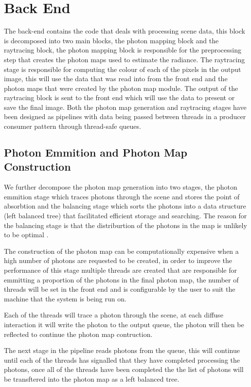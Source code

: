 \section{Back End}
The back-end contains the code that deals with processing scene data, this block is decomposed into
two main blocks, the photon mapping block and the raytracing block, the photon mapping block is responsible
for the preprocessing step that creates the photon maps used to estimate the radiance. The raytracing stage
is responsible for computing the colour of each of the pixels in the output image, this will use the data
that was read into from the front end and the photon maps that were created by the photon map module. The
output of the raytracing block is sent to the front end which will use the data to present or save the final
image. Both the photon map generation and raytracing stages have been designed as pipelines with data being passed
between threads in a producer consumer pattern through thread-safe queues.

\subsection{Photon Emmition and Photon Map Construction}
We further decompose the photon map generation into two stages, the photon emmition stage which traces photons
through the scene and stores the point of absorbtion and the balancing stage which sorts the photons into
a data structure (left balanced tree) that facilitated efficient storage and searching.
The reason for the balancing stage is that the distriburtion of the photons in the map is unlikely to be
optimal \cite{JensenBook}.

The construction of the photon map can be computationally expensive when a high number of photons are
requested to be created, in order to improve the performance of this stage multiple threads are created
that are responsible for emmitting a proportion of the photons in the final photon map, the number of threads will be
set in the front end and is configurable by the user to suit the machine that the system is being run on.

Each of the threads will trace a photon through the scene, at each diffuse interaction it will write the
photon to the output queue, the photon will then be reflected to continue the photon map contruction.

The next stage in the pipeline reads photons from the queue, this will continue until each of the threads
has signalled that they have completed processing the photons, once all of the threads have been completed the
the list of photons will be transftered into the photon map as a left balanced tree.

